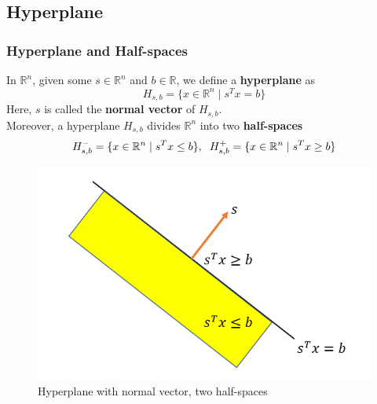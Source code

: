 \subsection{Hyperplane}
\begin{frame}\frametitle{Hyperplane and Half-spaces}
    \begin{definition}
        In $\mathbb{R}^{n}$, given some $s \in \mathbb{R}^{n}$ and $b \in \mathbb{R}$, we define a \textbf{hyperplane} as
        \begin{equation*}
            H_{s,b} = \{x \in \mathbb{R}^{n} \mid  s^{T} x = b\}
        \end{equation*}
        Here, $s$ is called the \textbf{normal vector} of $H_{s,b}$.\\
        Moreover, a hyperplane $H_{s,b}$ divides $\mathbb{R}^n$ into two \textbf{half-spaces}
        \begin{equation*}
            H_{s,b}^{-} = \{x \in \mathbb{R}^n \mid  s^T x \leq b\}, \hspace{2mm} H_{s,b}^{+} = \{x \in \mathbb{R}^n \mid  s^T x \geq b\}
        \end{equation*}
    \end{definition}

    \begin{figure}
    \includegraphics[scale=0.25]{./figures/hyperplane_halfspaces.png}
    \caption{Hyperplane with normal vector, two half-spaces}
    \end{figure}
\end{frame}

